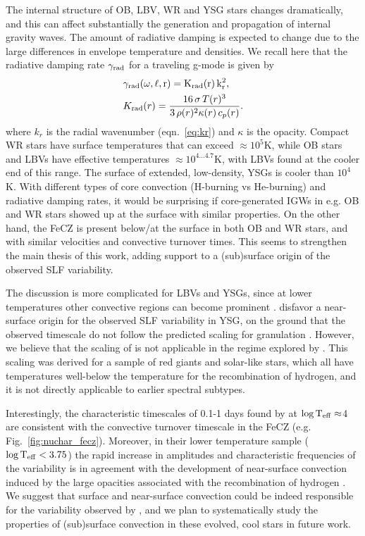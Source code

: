 \documentclass[twocolumn]{aastex63}
\begin{document}
The internal structure of OB, LBV, WR and YSG stars changes dramatically,  and this can affect substantially the generation and propagation of internal gravity waves.
The amount of radiative damping is expected to change due to the large differences in envelope temperature and densities.  We recall here that the radiative damping rate $ \gamma_{\rm rad}$ for a traveling g-mode is given by
\begin{align*}\label{eqn:gammarad}
	&\rm \gamma_{rad} (\omega, \ell, r) = K_{\rm rad} (r) \, k_{r}^{2},\\ %
	&K_{\rm rad} (r) = \frac{16 \, \sigma \, T(r)^{3}}{3 \, \rho(r)^{2} \kappa(r) \, c_{p}(r)}.%
\end{align*}
where $k_{r}$ is the radial wavenumber (eqn.~\ref{eq:kr}) and $\kappa$ is the opacity.
Compact WR stars have surface temperatures that can exceed $\approx 10^5$K, while OB stars and LBVs have effective temperatures $\approx 10^{4\dots4.7}$K, with LBVs found at the cooler end of this range.  The surface of extended, low-density, YSGs is cooler than $10^4$K.  With different types of core convection (H-burning vs He-burning) and radiative damping rates, it would be surprising if core-generated IGWs in e.g. OB and WR stars showed up at the surface with similar properties. On the other hand, the FeCZ is present below/at the surface in both OB and WR stars, and with similar velocities and convective turnover times. This seems to strengthen the main thesis of this work,  adding support to a (sub)surface origin of the observed SLF variability.

 The discussion is more complicated for LBVs and YSGs, since at lower temperatures other convective regions can become prominent \citep[driven by H and He recombination, see e.g.][]{2018Natur.561..498J}.  \citet{Dorn:2020} disfavor a near-surface origin for the observed SLF variability in YSG, on the ground that the observed timescale do not follow the predicted scaling for granulation \citep{Kallinger:2014}.  However, we believe that the scaling of \citet{Kallinger:2014} is not applicable in the regime explored by \citet{Dorn:2020}. This scaling was derived for a sample of red giants and solar-like stars, which all have temperatures well-below the temperature for the recombination of hydrogen, and it is not directly applicable to earlier
spectral subtypes. 

Interestingly, the characteristic timescales of 0.1-1 days found by \citet{Dorn:2020} at $\log {\rm T}_{\rm eff} \approx$4 are consistent with the convective turnover timescale in the FeCZ  (e.g. Fig.~\ref{fig:nuchar_fecz}). Moreover, in their lower temperature sample ($\log {\rm T}_{\rm eff} < 3.75$) the rapid increase in amplitudes and characteristic frequencies  of the variability  is in agreement with the development of near-surface convection induced by the large opacities associated with the recombination of hydrogen \citep{Grassitelli:2015b}. We suggest that surface and near-surface convection could be indeed responsible for the variability observed by \citet{Dorn:2020}, and we plan to systematically study the properties of (sub)surface convection in these evolved, cool stars in future work. 
\end{document}
